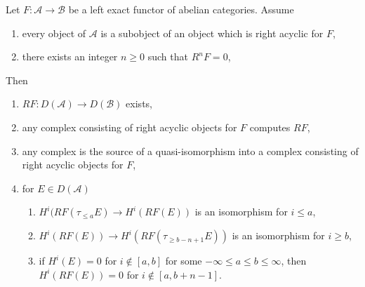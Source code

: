 \begin{lemma}
\label{lemma-unbounded-right-derived}
Let $F : \mathcal{A} \to \mathcal{B}$ be a left exact functor of
abelian categories. Assume
\begin{enumerate}
\item every object of $\mathcal{A}$ is a subobject of an object
which is right acyclic for $F$,
\item there exists an integer $n \geq 0$ such that $R^nF = 0$,
\end{enumerate}
Then
\begin{enumerate}
\item $RF : D(\mathcal{A}) \to D(\mathcal{B})$ exists,
\item any complex consisting of right acyclic objects for $F$ computes $RF$,
\item any complex is the source of a quasi-isomorphism into a complex
consisting of right acyclic objects for $F$,
\item for $E \in D(\mathcal{A})$
\begin{enumerate}
\item $H^i(RF(\tau_{\leq a}E) \to H^i(RF(E))$ is an isomorphism
for $i \leq a$,
\item $H^i(RF(E)) \to H^i(RF(\tau_{\geq b - n + 1}E))$ is an isomorphism
for $i \geq b$,
\item if $H^i(E) = 0$ for $i \not \in [a, b]$ for some
$-\infty \leq a \leq b \leq \infty$, then $H^i(RF(E)) = 0$
for $i \not \in [a, b + n - 1]$.
\end{enumerate}
\end{enumerate}
\end{lemma}

